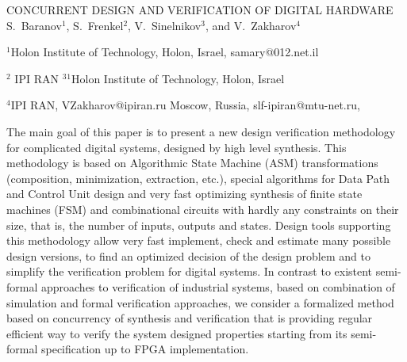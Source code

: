 CONCURRENT DESIGN AND VERIFICATION OF DIGITAL HARDWARE
S.~Baranov$^1$,  S.~Frenkel$^2$, V.~Sinelnikov$^3$, and V.~Zakharov$^4$

    $^1$Holon Institute of Technology, Holon, Israel, samary@012.net.il

                    $^2$  IPI RAN
$^3$$^1$Holon Institute of Technology, Holon, Israel

$^4$IPI RAN,  VZakharov@ipiran.ru
                                     Moscow, Russia, slf-ipiran@mtu-net.ru,


The main goal of this paper is to present a new design verification methodology for complicated digital
systems, designed by high level synthesis. This methodology is based on Algorithmic State Machine (ASM)
transformations (composition, minimization, extraction, etc.), special algorithms for Data Path and Control Unit design
and very fast optimizing synthesis of finite state machines  (FSM) and combinational circuits with hardly any constraints
on their size, that is, the number of inputs, outputs and states. Design tools supporting this methodology allow very fast
implement, check and estimate many possible design versions, to find an optimized decision of the design problem and
to simplify the verification problem for digital systems.
 In contrast to existent semi-formal approaches to verification of industrial systems, based on combination of simulation
and formal verification approaches, we consider a formalized method based on concurrency of synthesis and verification
that is providing regular efficient way to verify the system designed properties starting from its semi-formal specification
up to FPGA implementation.

